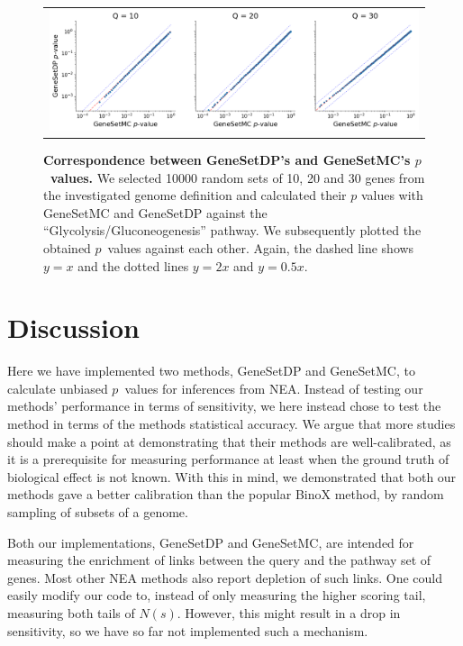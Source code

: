 \documentclass[10pt,letterpaper]{article}
\begin{document}
\begin{figure}[htb]
  \begin{center}
		  \begin{tabular}[t]{c}
				\includegraphics[width=.9\textwidth]{figures/scatter_dp_mc.png}
		\end{tabular}
  \end{center}
  \caption{{\bf Correspondence between GeneSetDP's and GeneSetMC's $p$~values.} We selected 10000 random sets of 10, 20 and 30 genes from the investigated genome definition and calculated their $p$ values with GeneSetMC and GeneSetDP against the ``Glycolysis/Gluconeogenesis'' pathway. We subsequently plotted the obtained $p$~values against each other. Again, the dashed line shows $y = x$ and the dotted lines $y = 2x$ and $y = 0.5x$.}
  \label{fig:pscatter}
\end{figure}



\section*{Discussion}

Here we have implemented two methods, GeneSetDP and GeneSetMC, to calculate unbiased $p$~values for inferences from NEA.
Instead of testing our methods' performance in terms of sensitivity, we here instead chose to test the method in terms of the methods statistical accuracy. We argue that more studies should make a point at demonstrating that their methods are well-calibrated, as it is a prerequisite for measuring performance at least when the ground truth of biological effect is not known.
With this in mind, we demonstrated that both our methods gave a better calibration than the popular BinoX method, by random sampling of subsets of a genome.

Both our implementations, GeneSetDP and GeneSetMC, are intended for measuring the enrichment of links between the query and the pathway set of genes. Most other NEA methods also report depletion of such links. One could easily modify our code to, instead of only measuring the higher scoring tail, measuring both tails of $N(s)$. However, this might result in a drop in sensitivity, so we have so far not implemented such a mechanism.
\end{document}
